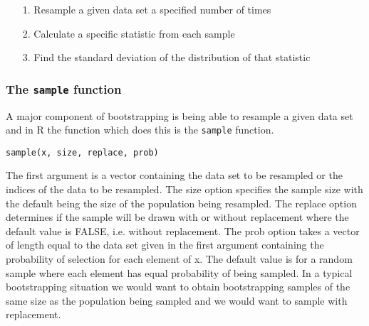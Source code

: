 \documentclass[12pt]{article}
\begin{document}
\begin{itemize}
\item[1.] Resample a given data set a specified number of times
\item[2.] Calculate a specific statistic from each sample
\item[3.] Find the standard deviation of the distribution of that statistic
\end{itemize}

\subsubsection*{The \texttt{sample} function}

A major component of bootstrapping is being able to resample a given data set and in R the function which does this is the \texttt{sample} function.
\begin{framed}
\begin{verbatim}
sample(x, size, replace, prob)
\end{verbatim}
\end{framed}
The first argument is a vector containing the data set to be resampled or the indices of the data to be resampled. The size option specifies the sample size with the default being the size of the population being resampled. The replace option determines if the sample will be drawn with or without replacement where the default value is FALSE, i.e. without replacement. The prob option takes a vector of length equal to the data set given in the first argument containing the probability of selection for each element of x. The default value is for a random sample where each element has equal probability of being sampled. In a typical bootstrapping situation we would want to obtain bootstrapping samples of the same size as the population being sampled and we would want to sample with replacement.
\end{document}
